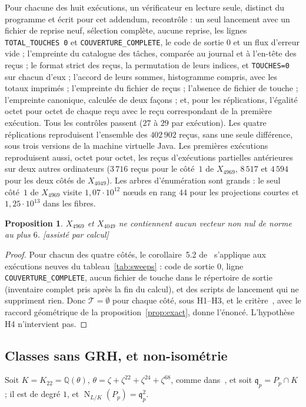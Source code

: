 \documentclass[11pt,a4paper]{amsart}
\theoremstyle{plain}
\newtheorem{proposition}{Proposition}[section]
\theoremstyle{definition}
\newcommand{\Q}{\mathbb{Q}}
\newcommand{\Tc}{\mathcal{T}}
\newcommand{\q}{\mathfrak{q}}
\DeclareMathOperator{\Nm}{N}
\newcommand{\st}[1]{\textup{\textsf{\small[#1]}}}
\newcommand{\ASS}{\st{assisté par calcul}}
\begin{document}
Pour chacune des huit exécutions, un vérificateur en lecture seule, distinct du programme et écrit pour cet addendum, recontrôle : un seul lancement avec un fichier de reprise neuf, sélection complète, aucune reprise, les lignes \texttt{TOTAL\_TOUCHES 0} et \texttt{COUVERTURE\_COMPLETE}, le code de sortie $0$ et un flux d'erreur vide ; l'empreinte du catalogue des tâches, comparée au journal et à l'en-tête des reçus ; le format strict des reçus, la permutation de leurs indices, et \texttt{TOUCHES=0} sur chacun d'eux ; l'accord de leurs sommes, histogramme compris, avec les totaux imprimés ; l'empreinte du fichier de reçus ; l'absence de fichier de touche ; l'empreinte canonique, calculée de deux façons ; et, pour les réplications, l'égalité octet pour octet de chaque reçu avec le reçu correspondant de la première exécution. Tous les contrôles passent ($27$ à $29$ par exécution). Les quatre réplications reproduisent l'ensemble des $402\,902$ reçus, sans une seule différence, sous trois versions de la machine virtuelle Java. Les premières exécutions reproduisent aussi, octet pour octet, les reçus d'exécutions partielles antérieures sur deux autres ordinateurs ($3\,716$ reçus pour le côté~$1$ de $X_{4969}$, $8\,517$ et $4\,594$ pour les deux côtés de $X_{4049}$). Les arbres d'énumération sont grands : le seul côté~$1$ de $X_{4969}$ visite $1{,}07\cdot10^{12}$ nœuds en rang $44$ pour les projections courtes et $1{,}25\cdot10^{13}$ dans les fibres.

\begin{proposition}\label{prop:sweeps}
$X_{4969}$ et $X_{4049}$ ne contiennent aucun vecteur non nul de norme au plus $6$. \ASS
\end{proposition}

\begin{proof}
Pour chacun des quatre côtés, le corollaire~5.2 de~\cite{Gau26} s'applique aux exécutions neuves du tableau~\ref{tab:sweeps} : code de sortie $0$, ligne \texttt{COUVERTURE\_COMPLETE}, aucun fichier de touche dans le répertoire de sortie (inventaire complet pris après la fin du calcul), et des scripts de lancement qui ne suppriment rien. Donc $\Tc=\emptyset$ pour chaque côté, sous H1--H3, et le critère~\cite[th.~4.6]{Gau26}, avec le raccord géométrique de la proposition~\ref{prop:exact}, donne l'énoncé. L'hypothèse H4 n'intervient pas.
\end{proof}

\subsection{Classes sans GRH, et non-isométrie}
Soit $K=K_{22}=\Q(\theta)$, $\theta=\zeta+\zeta^{22}+\zeta^{24}+\zeta^{68}$, comme dans~\cite[\S6.4]{Gau26}, et soit $\q_p=P_p\cap K$ ; il est de degré $1$, et $\Nm_{L/K}(P_p)=\q_p^2$.
\end{document}
